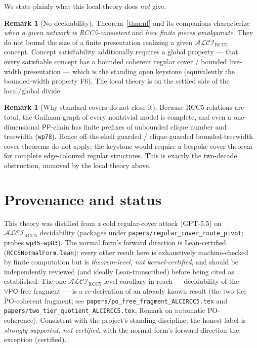 \documentclass[11pt]{article}
\newcommand{\PO}{\mathsf{PO}}
\newcommand{\PP}{\mathsf{PP}}
\newcommand{\ALCIRCC}{\mathcal{ALCI}_{\mathrm{RCC5}}}
\newcommand{\code}[1]{\texttt{#1}}
\theoremstyle{plain}
\theoremstyle{definition}
\newtheorem{remark}[theorem]{Remark}
\begin{document}
We state plainly what this local theory does \emph{not} give.

\begin{remark}[No decidability]
Theorem~\ref{thm:nf} and its companions characterize \emph{when a given
network is RCC5-consistent} and \emph{how finite pieces amalgamate}. They
do not bound the size of a finite presentation realizing a given
$\ALCIRCC$ concept. Concept satisfiability additionally requires a global
property --- that every satisfiable concept has a bounded coherent
regular cover / bounded live-width presentation --- which is the standing
open keystone (equivalently the bounded-width property F6). The local
theory is on the settled side of the local/global divide.
\end{remark}

\begin{remark}[Why standard covers do not close it]
Because RCC5 relations are total, the Gaifman graph of every nontrivial
model is complete, and even a one-dimensional $\PP$-chain has finite
prefixes of unbounded clique number and treewidth (\code{wp78}). Hence
off-the-shelf guarded / clique-guarded bounded-treewidth cover theorems
do not apply; the keystone would require a bespoke cover theorem for
complete edge-coloured regular structures. This is exactly the two-decade
obstruction, unmoved by the local theory above.
\end{remark}

\section{Provenance and status}

This theory was distilled from a cold regular-cover attack (GPT-5.5) on
$\ALCIRCC$ decidability (packages under
\code{papers/regular\_cover\_route\_pivot}; probes \code{wp45}--\code{wp83}).
The normal form's forward direction is Lean-certified
(\code{RCC5NormalForm.lean}); every other result here is
exhaustively machine-checked by finite computation but is
\emph{theorem-level, not kernel-certified}, and should be independently
reviewed (and ideally Lean-transcribed) before being cited as
established. The one $\ALCIRCC$-level corollary in reach --- decidability
of the $\forall\PO$-free fragment --- is a re-derivation of an already
known result (the two-tier PO-coherent fragment; see
\code{papers/po\_free\_fragment\_ALCIRCC5.tex} and
\code{papers/two\_tier\_quotient\_ALCIRCC5.tex}, Remark on automatic
PO-coherence). Consistent with the project's standing discipline, the
honest label is \emph{strongly supported, not certified}, with the
normal form's forward direction the exception (certified).
\end{document}
